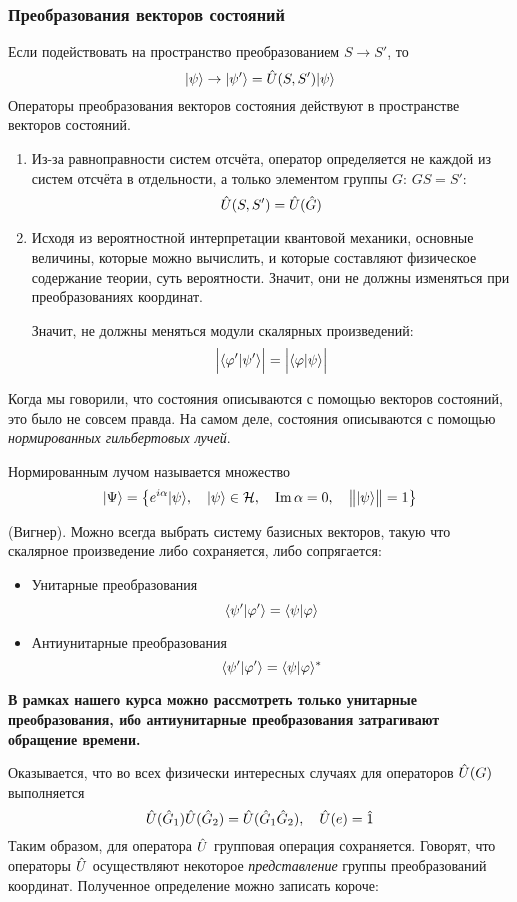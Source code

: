 \subsubsection{Преобразования векторов состояний}
Если подействовать на пространство преобразованием $S \to S'$, то
$$
    | \psi \rangle \to | \psi' \rangle = \Hat U (S, S') | \psi \rangle
$$
Операторы преобразования векторов состояния действуют в пространстве векторов состояний.
\pagebreak[3]
\Rem
\begin{enumerate}
  \item Из-за равноправности систем отсчёта, оператор определяется не каждой из систем отсчёта в отдельности, а только элементом группы $G$: $GS = S'$:
      $$
        \Hat U(S, S') = \Hat U (\Hat G)
      $$
  \item Исходя из вероятностной интерпретации квантовой механики, основные величины, которые можно вычислить, и которые составляют физическое содержание теории, суть вероятности. Значит, они не должны изменяться при преобразованиях координат.
      
      Значит, не должны меняться модули скалярных произведений:
      $$
        \Big| \langle \varphi' | \psi' \rangle \Big| = \Big| \langle \varphi | \psi \rangle \Big|
      $$
\end{enumerate}
Когда мы говорили, что состояния описываются с помощью векторов состояний, это было не совсем правда. На самом деле, состояния описываются с помощью \emph{нормированных гильбертовых лучей}.

\Def Нормированным лучом называется множество
$$
      | \Psi \rangle = \big\{
          e^{i\alpha} | \psi \rangle, \quad | \psi \rangle \in \mathcal H, \quad \mathrm{Im}\, \alpha = 0, \quad \big\|| \psi \rangle \big\| = 1
      \big\}
$$

\Th (Вигнер).
Можно всегда выбрать систему базисных векторов, такую что скалярное произведение либо сохраняется, либо сопрягается:
\begin{itemize}
  \item Унитарные преобразования
  $$
      \langle \psi' | \varphi' \rangle = \langle \psi | \varphi \rangle
  $$
  \item Антиунитарные преобразования
  $$
      \langle \psi' | \varphi' \rangle = \langle \psi | \varphi \rangle^\ast
  $$
\end{itemize}
\textbf{В рамках нашего курса можно рассмотреть только унитарные преобразования, ибо антиунитарные преобразования затрагивают обращение времени.}

\Rem Оказывается, что во всех физически интересных случаях для операторов $\Hat U(G)$ выполняется
$$
    \Hat U(\Hat G_1) \Hat U(\Hat G_2) = \Hat U(\Hat G_1 \Hat G_2), \quad \Hat U(e) = \Hat 1
$$
Таким образом, для оператора $\Hat U$ групповая операция сохраняется. Говорят, что операторы $\Hat U$ осуществляют некоторое \emph{представление} группы преобразований координат. Полученное определение можно записать короче:

